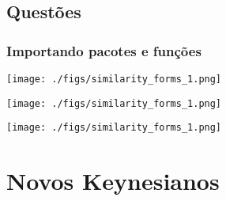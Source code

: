 \documentclass[11pt]{article}
\begin{document}
\subsection{Questões}
\label{sec:orgdfa711d}



\subsubsection{Importando pacotes e funções}
\label{sec:org4001b6c}

\begin{center}
\texttt{[image: ./figs/similarity\_forms\_1.png]}
\end{center}
\begin{center}
\texttt{[image: ./figs/similarity\_forms\_1.png]}
\end{center}
\begin{center}
\texttt{[image: ./figs/similarity\_forms\_1.png]}
\end{center}





\section{Novos Keynesianos}
\label{sec:orge240eed}
\end{document}
